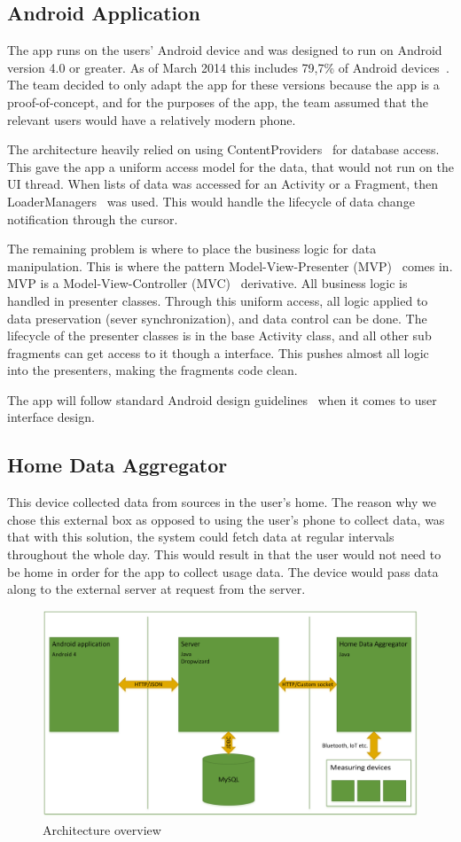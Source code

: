 \subsection{Android Application}
The app runs on the users' Android device and was designed to run on Android version 4.0 or greater. As of March 2014 this includes 79,7\% of Android devices~\cite{AndroidDeviceFragmentation}. The team decided to only adapt the app for these versions because the app is a proof-of-concept, and for the purposes of the app, the team assumed that the relevant users would have a relatively modern phone. 

The architecture heavily relied on using ContentProviders~\cite{contentproviders} for database access. This gave the app a uniform access model for the data, that would not run on the UI thread. When lists of data was accessed for an Activity or a Fragment, then LoaderManagers~\cite{loadermanager} was used. This would handle the lifecycle of data change notification through the cursor. 

The remaining problem is where to place the business logic for data manipulation. This is where the pattern Model-View-Presenter (MVP)~\cite{mvp} comes in. MVP is a Model-View-Controller (MVC)~\cite{mvc} derivative. All business logic is handled in presenter classes. Through this uniform access, all logic applied to data preservation (sever synchronization), and data control can be done. The lifecycle of the presenter classes is in the base Activity class, and all other sub fragments can get access to it though a interface. This pushes almost all logic into the presenters, making the fragments code clean.

The app will follow standard Android design guidelines~\cite{Androidgui}
when it comes to user interface design.

\subsection{Home Data Aggregator}
This device collected data from sources in the user's home. The reason why we chose this external box as opposed to using the user's phone to collect data, was that with this solution, the system could fetch data at regular intervals throughout the whole day. This would result in that the user would not need to be home in order for the app to collect 
usage data. The device would pass data along to the external server at request from the server.

\begin{figure}[H]
\includegraphics[width=\textwidth]{ch/architecture/fig/architecture.png}
\caption{Architecture overview}
\end{figure}
